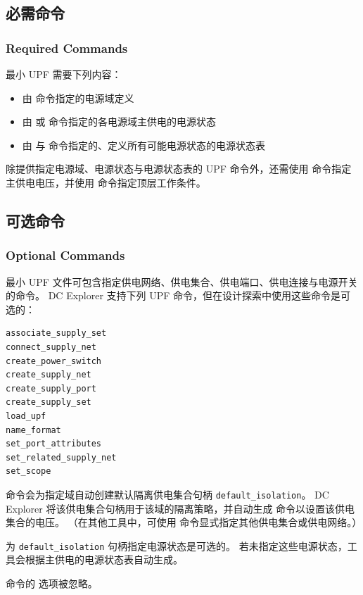 \subsection{必需命令}
\subsubsection*{Required Commands}

最小 UPF 需要下列内容：
\begin{itemize}
  \item 由  命令指定的电源域定义
  \item 由  或  命令指定的各电源域主供电的电源状态
  \item 由  与  命令指定的、定义所有可能电源状态的电源状态表
\end{itemize}

除提供指定电源域、电源状态与电源状态表的 UPF 命令外，还需使用  命令指定主供电电压，并使用  命令指定顶层工作条件。

\subsection{可选命令}
\subsubsection*{Optional Commands}

最小 UPF 文件可包含指定供电网络、供电集合、供电端口、供电连接与电源开关的命令。
DC Explorer 支持下列 UPF 命令，但在设计探索中使用这些命令是可选的：
\begin{lstlisting}
associate_supply_set
connect_supply_net
create_power_switch
create_supply_net
create_supply_port
create_supply_set
load_upf
name_format
set_port_attributes
set_related_supply_net
set_scope
\end{lstlisting}

 命令会为指定域自动创建默认隔离供电集合句柄 \texttt{default\_isolation}。
DC Explorer 将该供电集合句柄用于该域的隔离策略，并自动生成  命令以设置该供电集合的电压。
（在其他工具中，可使用  命令显式指定其他供电集合或供电网络。）

为 \texttt{default\_isolation} 句柄指定电源状态是可选的。
若未指定这些电源状态，工具会根据主供电的电源状态表自动生成。

 命令的  选项被忽略。

